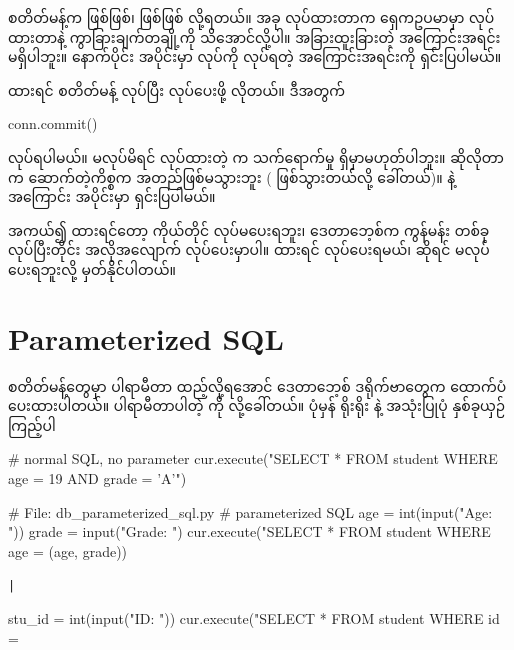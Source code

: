  စတိတ်မန့်က    ဖြစ်ဖြစ်၊  ဖြစ်ဖြစ်  လို့ရတယ်။ အခု  လုပ်ထားတာက ရှေကဥပမာမှာ  လုပ်ထားတာနဲ့ ကွာခြားချက်တချို့ကို သိအောင်လို့ပါ။ အခြားထူးခြားတဲ့ အကြောင်းအရင်း မရှိပါဘူး။ နောက်ပိုင်း  အပိုင်းမှာ  လုပ်ကို လုပ်ရတဲ့ အကြောင်းအရင်းကို ရှင်းပြပါမယ်။


  ထားရင်  စတိတ်မန့်  လုပ်ပြီး  လုပ်ပေးဖို့ လိုတယ်။ ဒီအတွက်
%
\begin{py}
conn.commit()
\end{py}
%
လုပ်ရပါမယ်။  မလုပ်မိရင်  လုပ်ထားတဲ့  က သက်ရောက်မှု ရှိမှာမဟုတ်ပါဘူး။ ဆိုလိုတာက  ဆောက်တဲ့ကိစ္စက အတည်ဖြစ်မသွားဘူး ( ဖြစ်သွားတယ်လို့ ခေါ်တယ်)။  နဲ့  အကြောင်း  အပိုင်းမှာ ရှင်းပြပါမယ်။

အကယ်၍   ထားရင်တော့ ကိုယ်တိုင်  လုပ်မပေးရဘူး၊ ဒေတာဘေ့စ်က  ကွန်မန်း တစ်ခု  လုပ်ပြီးတိုင်း အလိုအလျောက်  လုပ်ပေးမှာပါ။  ထားရင်  လုပ်ပေးရမယ်၊  ဆိုရင် မလုပ်ပေးရဘူးလို့ မှတ်နိုင်ပါတယ်။


\section{Parameterized SQL}
 စတိတ်မန့်တွေမှာ ပါရာမီတာ ထည့်လို့ရအောင် ဒေတာဘေ့စ် ဒရိုက်ဗာတွေက ထောက်ပံပေးထားပါတယ်။ ပါရာမီတာပါတဲ့  ကို  လို့ခေါ်တယ်။ ပုံမှန် ရိုးရိုး  နဲ့  အသုံးပြုပုံ နှစ်ခုယှဉ်ကြည့်ပါ
%
\begin{py}
# normal SQL, no parameter
cur.execute("SELECT * FROM student WHERE age = 19 AND grade = 'A'")
\end{py}
%
%
\begin{py}
# File: db_parameterized_sql.py
# parameterized SQL
age = int(input("Age: "))
grade = input("Grade: ")
cur.execute("SELECT * FROM student WHERE age = %
            (age, grade))
\end{py}
%
\texttt|%
%
\begin{py}
stu_id = int(input("ID: "))
cur.execute("SELECT * FROM student WHERE id = %
\end{py}
%

